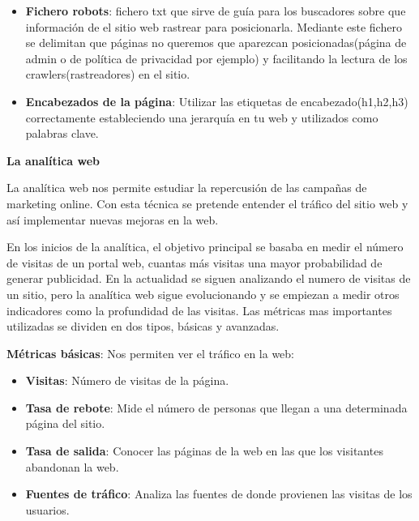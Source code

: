 \begin{itemize}
\item \textbf{Fichero robots}: fichero txt que sirve de guía para los buscadores sobre que información de el sitio web rastrear para posicionarla. Mediante este fichero se delimitan que páginas no queremos que aparezcan posicionadas(página de admin o de política de privacidad por ejemplo) y facilitando la lectura de los crawlers(rastreadores) en el sitio.

\item \textbf{Encabezados de la página}: Utilizar las etiquetas de encabezado(h1,h2,h3) correctamente estableciendo una jerarquía en tu web y utilizados como palabras clave.  


\end{itemize}

\vspace{5 mm}

\textbf{La analítica web}

\vspace{5 mm}

La analítica web nos permite estudiar la repercusión de las campañas de marketing online. Con esta técnica se pretende entender el tráfico del sitio web y así implementar nuevas mejoras en la web.

\vspace{5 mm}

En los inicios de la analítica, el objetivo principal se basaba en medir el número de visitas de un portal web, cuantas más visitas una mayor probabilidad de generar publicidad. En la actualidad se siguen analizando el numero de visitas de un sitio, pero la analítica web sigue evolucionando y se empiezan a medir otros indicadores como la profundidad de las visitas. Las métricas mas importantes utilizadas se dividen en dos tipos, básicas y avanzadas.


\textbf{Métricas básicas}: Nos permiten ver el tráfico en la web: 

\begin{itemize}

\item \textbf{Visitas}: Número de visitas de la página.

\item \textbf{Tasa de rebote}: Mide el número de personas que llegan a una determinada página del sitio.

\item \textbf{Tasa de salida}: Conocer las páginas de la web en las que los visitantes abandonan la web.

\item \textbf{Fuentes de tráfico}: Analiza las fuentes de donde provienen las visitas de los usuarios. 

\end{itemize}

